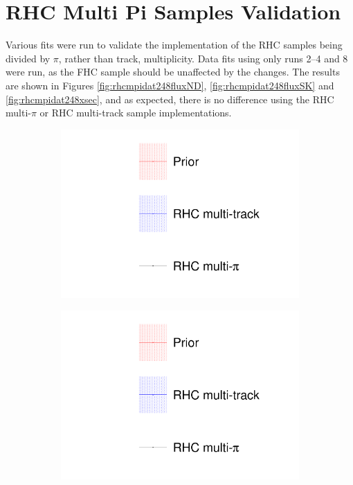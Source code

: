 \chapter{RHC Multi Pi Samples Validation}\label{appendix:rhcmpi}

Various fits were run to validate the implementation of the RHC samples being divided by $\pi$, rather than track, multiplicity. Data fits using only runs 2--4 and 8 were run, as the FHC sample should be unaffected by the changes. The results are shown in Figures \ref{fig:rhcmpidat248fluxND}, \ref{fig:rhcmpidat248fluxSK} and \ref{fig:rhcmpidat248xsec}, and as expected, there is no difference using the RHC multi-$\pi$ or RHC multi-track sample implementations. 

\begin{figure}[t]
\centering
\begin{subfigure}{0.3\textwidth}
  \centering
  \includegraphics[width=1.0\linewidth, trim={5mm  130mm 0mm 10mm}, clip]{figs/rhcmpdat248_leg}	
\end{subfigure}
\begin{subfigure}{0.3\textwidth}
  \centering
  \includegraphics[width=1.0\linewidth, trim={5mm  0mm 0mm 70mm}, clip]{figs/rhcmpdat248_leg}	

\end{subfigure}
\end{figure}
